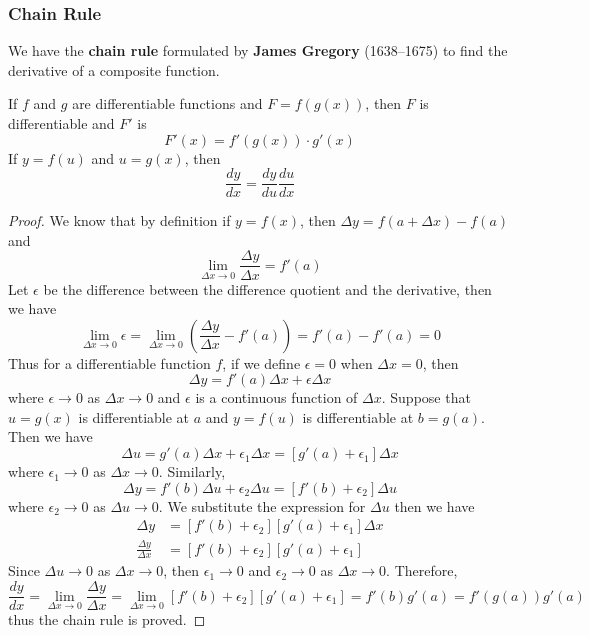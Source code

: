 \subsubsection*{Chain Rule}
We have the \textbf{chain rule} formulated by \textbf{James Gregory}
(1638--1675) to find the derivative of a composite function.
\begin{theorem}
    If \(f\) and \(g\) are differentiable functions and \(F=f(g(x))\),
    then \(F\) is differentiable and \(F'\) is
    \[F'(x)=f'(g(x))\cdot g'(x)\]
    If \(y=f(u)\) and \(u=g(x)\), then
    \[\frac{dy}{dx}=\frac{dy}{du}\frac{du}{dx}\]
\end{theorem}
\begin{proof}
    We know that by definition if \(y=f(x)\),
    then \(\Delta y=f(a+\Delta x)-f(a)\) and
    \[\lim_{\Delta x\to 0}\frac{\Delta y}{\Delta x}=f'(a)\]
    Let \(\epsilon\) be the difference between the difference quotient and the
    derivative, then we have
    \[\lim_{\Delta x\to 0}\epsilon
    =\lim_{\Delta x\to 0}\left(\frac{\Delta y}{\Delta x}-f'(a)\right)
    =f'(a)-f'(a)=0\]
    Thus for a differentiable function \(f\), if we define \(\epsilon=0\)
    when \(\Delta x=0\), then \[\Delta y=f'(a)\Delta x+\epsilon\Delta x\]
    where \(\epsilon\to 0\) as \(\Delta x\to 0\) and \(\epsilon\) is a
    continuous function of \(\Delta x\).
    Suppose that \(u=g(x)\) is differentiable at \(a\) and \(y=f(u)\) is
    differentiable at \(b=g(a)\).
    Then we have
    \[\Delta u=g'(a)\Delta x+\epsilon_1\Delta x=[g'(a)+\epsilon_1]\Delta x\]
    where \(\epsilon_1\to 0\) as \(\Delta x\to 0\).
    Similarly, \[\Delta y=f'(b)\Delta u+\epsilon_2\Delta u=[f'(b)+\epsilon_2]\Delta u\]
    where \(\epsilon_2\to 0\) as \(\Delta u\to 0\).
    We substitute the expression for \(\Delta u\) then we have
    \begin{align*}
        \Delta y &= [f'(b)+\epsilon_2][g'(a)+\epsilon_1]\Delta x \\
        \frac{\Delta y}{\Delta x} &= [f'(b)+\epsilon_2][g'(a)+\epsilon_1]
    \end{align*}
    Since \(\Delta u\to 0\) as \(\Delta x\to 0\), then \(\epsilon_1\to 0\) and
    \(\epsilon_2 \to 0\) as \(\Delta x\to 0\).
    Therefore,
    \[\frac{dy}{dx}=\lim_{\Delta x\to 0}\frac{\Delta y}{\Delta x}
    =\lim_{\Delta x\to 0}[f'(b)+\epsilon_2][g'(a)+\epsilon_1]
    =f'(b)g'(a)=f'(g(a))g'(a)\]
    thus the chain rule is proved.
\end{proof}